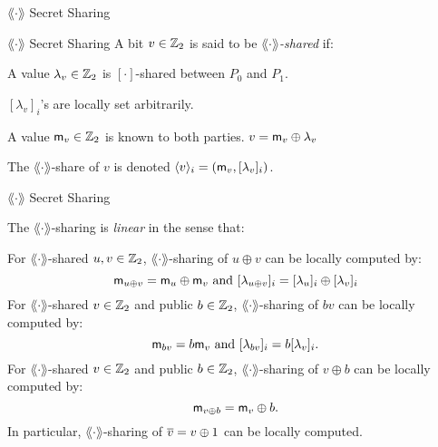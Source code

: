 \documentclass[../240906_cryptlab_flute.tex]{subfiles}
\begin{document}
\begin{frame}{\(\lang \cdot \rang\) Secret Sharing}
    \begin{block}{\(\lang\cdot\rang\) Secret Sharing}
        A bit \(v \in \mathbb{Z}_2\) is said to be \(\lang\cdot\rang\)\emph{-shared} if:
        \begin{enumerate}
            \ii
            A value \(\lambda_v \in \mathbb{Z}_2\) is \([\cdot]\)-shared between \(P_0\) and \(P_1\).
            \begin{itemize}
                \ii \([\lambda_v]_i\)'s are locally set arbitrarily.
            \end{itemize}
            \ii
            A value \(\mathsf{m}_v \in \mathbb{Z}_2\) is known to both parties.
            \ii
            \(v = \mathsf{m}_v \oplus \lambda_v\)
        \end{enumerate}

        The \(\lang \cdot \rang\)-share of \(v\) is denoted
        \(\langle v \rangle_i = (\mathsf{m}_v, [\lambda_v]_i)\).
    \end{block}
\end{frame}

\begin{frame}{{\(\lang \cdot \rang\) Secret Sharing}}
    \begin{exampleblock}{}
        \small
        The \(\lang\cdot\rang\)-sharing is \emph{linear} in the sense that:
        \begin{enumerate}
            \ii
            For \(\lang\cdot\rang\)-shared \(u, v \in \mathbb{Z}_2\),
            \(\lang\cdot\rang\)-sharing of \(u \oplus v\) can be locally computed by:
            \[
                \mathsf{m}_{u \oplus v} = \mathsf{m}_u \oplus \mathsf{m}_v~\text{and}~
                [\lambda_{u \oplus v}]_i = [\lambda_u]_i \oplus [\lambda_v]_i
            \]
            \ii
            For \(\lang\cdot\rang\)-shared \(v \in \mathbb{Z}_2\) and public \(b \in \mathbb{Z}_2\),
            \(\lang\cdot\rang\)-sharing of \(bv\) can be locally computed by:
            \[
                \mathsf{m}_{bv} = b\mathsf{m}_v~\text{and}~
                [\lambda_{bv}]_i = b[\lambda_v]_i.
            \]
            \ii
            For \(\lang\cdot\rang\)-shared \(v \in \mathbb{Z}_2\) and public \(b \in \mathbb{Z}_2\),
            \(\lang\cdot\rang\)-sharing of \(v \oplus b\) can be locally computed by:
            \[
                \mathsf{m}_{v \oplus b} = \mathsf{m}_v \oplus b.
            \]
            In particular, \(\lang\cdot\rang\)-sharing of \(\overline{v} = v \oplus 1\) can be locally computed.
        \end{enumerate}
    \end{exampleblock}
\end{frame}
\end{document}
